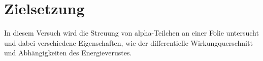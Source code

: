 \section{Zielsetzung}

\label{sec:Zielsetzung}
In diesem Versuch wird die Streuung von alpha-Teilchen an einer Folie untersucht und dabei verschiedene Eigenschaften, wie
der differentielle Wirkungquerschnitt und Abhängigkeiten des Energieverustes.
